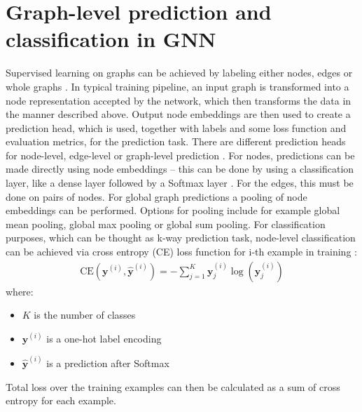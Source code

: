 \section{Graph-level prediction and classification in GNN}
Supervised learning on graphs can be achieved by labeling either nodes, edges or whole graphs \cite{Lesk2024}. In typical training pipeline, an input graph is transformed into a node representation accepted by the network, which then transforms the data in the manner described above. Output node embeddings are then used to create a prediction head, which is used, together with labels and some loss function and evaluation metrics, for the prediction task. There are different prediction heads for node-level, edge-level or graph-level prediction \cite{Lesk2024}. For nodes, predictions can be made directly using node embeddings -- this can be done by using a classification layer, like a dense layer followed by a Softmax layer \cite{sanch2021}.  For the edges, this must be done on pairs of nodes. For global graph predictions a pooling of node embeddings can be performed. Options for pooling include for example global mean pooling, global max pooling or global sum pooling. For classification purposes, which can be thought as k-way prediction task, node-level classification can be achieved via cross entropy (CE) loss function for i-th example in training \cite{Lesk2024}:
\begin{align}
    \text{CE}({\mathbf{y}}^{(i)}, {\hat{\mathbf{y}}}^{(i)}) = -\sum_{j=1}^{K} {\mathbf{y}}_{j}^{(i)} \log({\hat{\mathbf{y}}}_{j}^{(i)})
\end{align}
where:
\begin{itemize}
    \item $K$ is the number of classes
    \item ${\mathbf{y}}^{(i)}$ is a one-hot label encoding
    \item ${\hat{\mathbf{y}}}^{(i)}$ is a prediction after Softmax
\end{itemize}
Total loss over the training examples can then be calculated as a sum of cross entropy for each example.